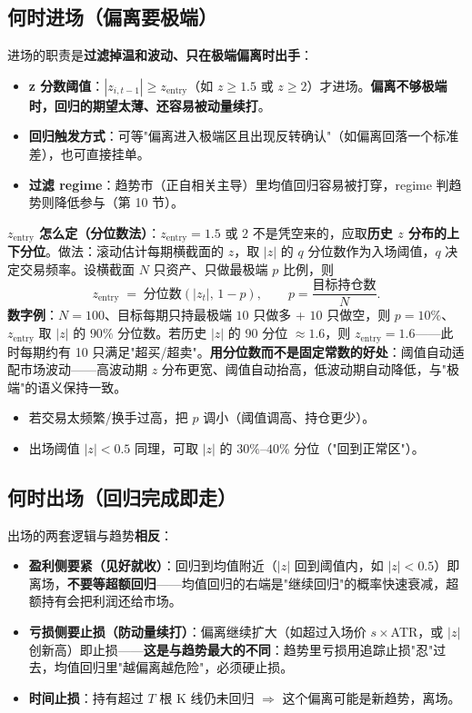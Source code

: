 \documentclass[UTF8,11pt]{ctexart}
\begin{document}
\subsection{何时进场（偏离要极端）}
进场的职责是\textbf{过滤掉温和波动、只在极端偏离时出手}：
\begin{itemize}[itemsep=2pt]
\item \textbf{z 分数阈值}：$|z_{i,t-1}| \ge z_{\text{entry}}$（如 $z\ge1.5$ 或 $z\ge2$）才进场。\textbf{偏离不够极端时，回归的期望太薄、还容易被动量续打}。
\item \textbf{回归触发方式}：可等"偏离进入极端区且出现反转确认"（如偏离回落一个标准差），也可直接挂单。
\item \textbf{过滤 regime}：趋势市（正自相关主导）里均值回归容易被打穿，regime 判趋势则降低参与（第 10 节）。
\end{itemize}

\textbf{$z_{\text{entry}}$ 怎么定（分位数法）}：$z_{\text{entry}}=1.5$ 或 $2$ 不是凭空来的，应取\textbf{历史 $z$ 分布的上下分位}。做法：滚动估计每期横截面的 $z$，取 $|z|$ 的 $q$ 分位数作为入场阈值，$q$ 决定交易频率。设横截面 $N$ 只资产、只做最极端 $p$ 比例，则
\begin{equation}
z_{\text{entry}} \;=\; \text{分位数}(|z_{t}|,\, 1-p),\qquad p=\frac{\text{目标持仓数}}{N}.
\end{equation}
\textbf{数字例}：$N=100$、目标每期只持最极端 $10$ 只做多 + $10$ 只做空，则 $p=10\%$、$z_{\text{entry}}$ 取 $|z|$ 的 $90\%$ 分位数。若历史 $|z|$ 的 90 分位 $\approx1.6$，则 $z_{\text{entry}}=1.6$——此时每期约有 10 只满足"超买/超卖"。\textbf{用分位数而不是固定常数的好处}：阈值自动适配市场波动——高波动期 $z$ 分布更宽、阈值自动抬高，低波动期自动降低，与"极端"的语义保持一致。
\begin{itemize}[itemsep=2pt]
\item 若交易太频繁/换手过高，把 $p$ 调小（阈值调高、持仓更少）。
\item 出场阈值 $|z|<0.5$ 同理，可取 $|z|$ 的 $30\%$--$40\%$ 分位（"回到正常区"）。
\end{itemize}

\subsection{何时出场（回归完成即走）}
出场的两套逻辑与趋势\textbf{相反}：
\begin{itemize}[itemsep=2pt]
\item \textbf{盈利侧要紧（见好就收）}：回归到均值附近（$|z|$ 回到阈值内，如 $|z|<0.5$）即离场，\textbf{不要等超额回归}——均值回归的右端是"继续回归"的概率快速衰减，超额持有会把利润还给市场。
\item \textbf{亏损侧要止损（防动量续打）}：偏离继续扩大（如超过入场价 $s\times$ATR，或 $|z|$ 创新高）即止损——\textbf{这是与趋势最大的不同}：趋势里亏损用追踪止损"忍"过去，均值回归里"越偏离越危险"，必须硬止损。
\item \textbf{时间止损}：持有超过 $T$ 根 K 线仍未回归 $\Rightarrow$ 这个偏离可能是新趋势，离场。
\end{itemize}
\end{document}
